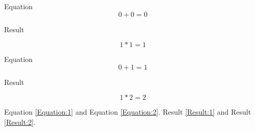 \documentclass{report}
\makeatletter
\newcounter{result}
\newcommand{\changeequationintoresult}{%
			\let\c@equation\c@result\let\theequation\theresult%
		}
\newenvironment{results}{\changeequationintoresult}{}
\makeatother
\begin{document}
Equation
\begin{equation} \label{Equation:1}
	0+0=0
\end{equation}

Result
\begin{results}
	\begin{equation} \label{Result:1}
	1*1=1
	\end{equation}
\end{results}

Equation
\begin{equation} \label{Equation:2}
 0+1=1
\end{equation}

Result
\begin{results}
	\begin{equation} \label{Result:2}
		1*2=2
	\end{equation}
\end{results}

Equation \ref{Equation:1} and Equation \ref{Equation:2}.
Result \ref{Result:1} and Result \ref{Result:2}.
\end{document}
